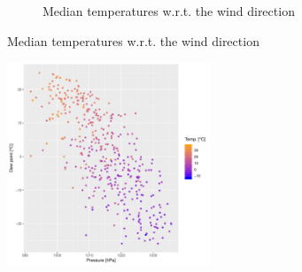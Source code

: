 \documentclass[a4paper, 12pt]{article}
\begin{document}
\begin{figure}[h]
\begin{subfigure}{.48\textwidth}
          \caption{Median temperatures w.r.t. the wind direction}
          \label{fig:temp_dir}
        \end{subfigure}
        \label{fig:wind}
    \end{figure}

    \begin{figure}
	    \centering
	    \includegraphics[width=0.54\textwidth]{resources/pdf/pres_dewp_temp.pdf}
	    \label{fig:pres_dewp}
	    \vspace{-4em}
	\end{figure}
\end{document}
